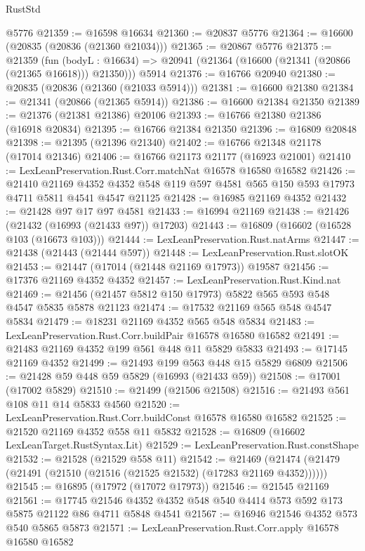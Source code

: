 \begin{lexlean}{RustStd}
\begin{coremodule}
{\begin{coremodule}
{{{{{{{{{{{{{{{{{{{{{{{{{{{{{{{{{{{{{{{{{{{{{{{{{{{{{{{    @5776
@21359 := @16598 @16634
@21360 := @20837 @5776
@21364 := @16600 (@20835 (@20836 (@21360 @21034)))
@21365 := @20867 @5776
@21375 := @21359
    (fun (bodyL : @16634) => @20941 (@21364 (@16600 (@21341 (@20866 (@21365 @16618))) @21350)))
    @5914
@21376 := @16766 @20940
@21380 := @20835 (@20836 (@21360 (@21033 @5914)))
@21381 := @16600 @21380
@21384 := @21341 (@20866 (@21365 @5914))
@21386 := @16600 @21384 @21350
@21389 := @21376 (@21381 @21386) @20106
@21393 := @16766 @21380 @21386 (@16918 @20834)
@21395 := @16766 @21384 @21350
@21396 := @16809 @20848
@21398 := @21395 (@21396 @21340)
@21402 := @16766 @21348 @21178 (@17014 @21346)
@21406 := @16766 @21173 @21177 (@16923 @21001)
@21410 := LexLeanPreservation.Rust.Corr.matchNat @16578 @16580 @16582
@21426 := @21410
    @21169
    @4352
    @4352
    @548
    @119
    @597
    @4581
    @565
    @150
    @593
    @17973
    @4711
    @5811
    @4541
    @4547
    @21125
@21428 := @16985 @21169 @4352
@21432 := @21428 @97 @17 @97 @4581
@21433 := @16994 @21169
@21438 := @21426 (@21432 (@16993 (@21433 @97)) @17203)
@21443 := @16809 (@16602 (@16528 @103 (@16673 @103)))
@21444 := LexLeanPreservation.Rust.natArms
@21447 := @21438 (@21443 (@21444 @597))
@21448 := LexLeanPreservation.Rust.slotOK
@21453 := @21447 (@17014 (@21448 @21169 @17973)) @19587
@21456 := @17376 @21169 @4352 @4352
@21457 := LexLeanPreservation.Rust.Kind.nat
@21469 := @21456 (@21457 @5812 @150 @17973) @5822 @565 @593 @548 @4547 @5835 @5878 @21123
@21474 := @17532 @21169 @565 @548 @4547 @5834
@21479 := @18231 @21169 @4352 @565 @548 @5834
@21483 := LexLeanPreservation.Rust.Corr.buildPair @16578 @16580 @16582
@21491 := @21483 @21169 @4352 @199 @561 @448 @11 @5829 @5833
@21493 := @17145 @21169 @4352
@21499 := @21493 @199 @563 @448 @15 @5829 @6809
@21506 := @21428 @59 @448 @59 @5829 (@16993 (@21433 @59))
@21508 := @17001 (@17002 @5829)
@21510 := @21499 (@21506 @21508)
@21516 := @21493 @561 @108 @11 @14 @5833 @4560
@21520 := LexLeanPreservation.Rust.Corr.buildConst @16578 @16580 @16582
@21525 := @21520 @21169 @4352 @558 @11 @5832
@21528 := @16809 (@16602 LexLeanTarget.RustSyntax.Lit)
@21529 := LexLeanPreservation.Rust.constShape
@21532 := @21528 (@21529 @558 @11)
@21542 := @21469 (@21474 (@21479 (@21491 (@21510 (@21516 (@21525 @21532) (@17283 @21169 @4352))))))
@21545 := @16895 (@17972 (@17072 @17973))
@21546 := @21545 @21169
@21561 := @17745
    @21546
    @4352
    @4352
    @548
    @540
    @4414
    @573
    @592
    @173
    @5875
    @21122
    @86
    @4711
    @5848
    @4541
@21567 := @16946 @21546 @4352 @573 @540 @5865 @5873
@21571 := LexLeanPreservation.Rust.Corr.apply @16578 @16580 @16582
}}}}}}}}}}}}}}}}}}}}}}}}}}}}}}}}}}}}}}}}}}}}}}}}}}}}}}}
\end{coremodule}}
\end{coremodule}
\end{lexlean}
